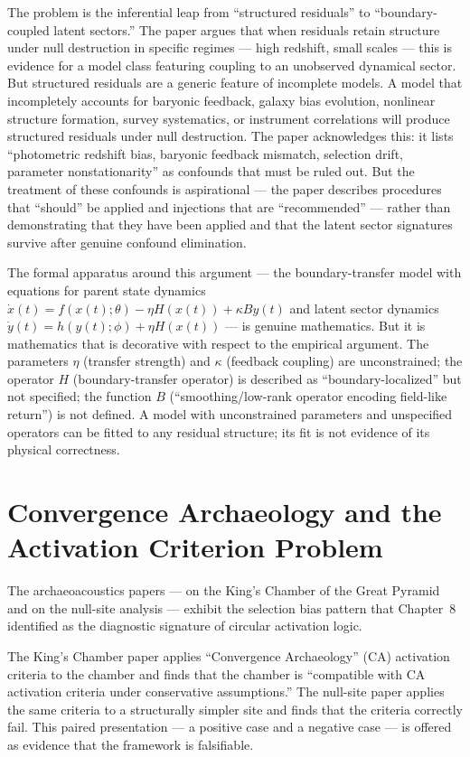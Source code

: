 \documentclass[12pt, openright, twoside]{book}
\begin{document}
The problem is the inferential leap from ``structured residuals'' to
``boundary-coupled latent sectors.'' The paper argues that when residuals
retain structure under null destruction in specific regimes --- high redshift,
small scales --- this is evidence for a model class featuring coupling to an
unobserved dynamical sector. But structured residuals are a generic feature
of incomplete models. A model that incompletely accounts for baryonic feedback,
galaxy bias evolution, nonlinear structure formation, survey systematics, or
instrument correlations will produce structured residuals under null destruction.
The paper acknowledges this: it lists ``photometric redshift bias, baryonic
feedback mismatch, selection drift, parameter nonstationarity'' as confounds
that must be ruled out. But the treatment of these confounds is aspirational
--- the paper describes procedures that ``should'' be applied and injections
that are ``recommended'' --- rather than demonstrating that they have been
applied and that the latent sector signatures survive after genuine confound
elimination.

The formal apparatus around this argument --- the boundary-transfer model
with equations for parent state dynamics $\dot{x}(t) = f(x(t);\theta) -
\eta H(x(t)) + \kappa B y(t)$ and latent sector dynamics $\dot{y}(t) =
h(y(t);\phi) + \eta H(x(t))$ --- is genuine mathematics. But it is mathematics
that is decorative with respect to the empirical argument. The parameters
$\eta$ (transfer strength) and $\kappa$ (feedback coupling) are unconstrained;
the operator $H$ (boundary-transfer operator) is described as ``boundary-localized''
but not specified; the function $B$ (``smoothing/low-rank operator encoding
field-like return'') is not defined. A model with unconstrained parameters
and unspecified operators can be fitted to any residual structure; its fit
is not evidence of its physical correctness.

\section{Convergence Archaeology and the Activation Criterion Problem}

The archaeoacoustics papers --- on the King's Chamber of the Great Pyramid
and on the null-site analysis --- exhibit the selection bias pattern that
Chapter~8 identified as the diagnostic signature of circular activation logic.

The King's Chamber paper applies ``Convergence Archaeology'' (CA) activation
criteria to the chamber and finds that the chamber is ``compatible with CA
activation criteria under conservative assumptions.'' The null-site paper applies
the same criteria to a structurally simpler site and finds that the criteria
correctly fail. This paired presentation --- a positive case and a negative case
--- is offered as evidence that the framework is falsifiable.
\end{document}
